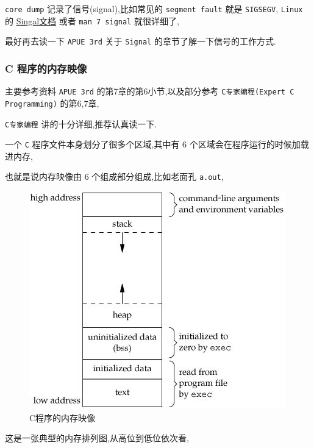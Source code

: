 \documentclass[11pt]{article}
\begin{document}
\texttt{core dump} 记录了信号(signal),比如常见的 \texttt{segment fault} 就是 \texttt{SIGSEGV}, \texttt{Linux} 的 \href{https://www.man7.org/linux/man-pages/man7/signal.7.html}{Singal文档} 或者 \texttt{man 7 signal} 就很详细了,

最好再去读一下 \texttt{APUE 3rd} 关于 \texttt{Signal} 的章节了解一下信号的工作方式.


\subsubsection{C 程序的内存映像}
\label{sec:org1aec749}

主要参考资料 \texttt{APUE 3rd} 的第7章的第6小节,以及部分参考 \texttt{C专家编程(Expert C Programming)} 的第6,7章,

\texttt{C专家编程} 讲的十分详细,推荐认真读一下.

一个 \texttt{C} 程序文件本身划分了很多个区域,其中有 6 个区域会在程序运行的时候加载进内存,

也就是说内存映像由 6 个组成部分组成,比如老面孔 \texttt{a.out},

\begin{figure}[htbp]
\centering
\includegraphics[width=.9\linewidth]{../../../files/program-image.jpg}
\caption{C程序的内存映像}
\end{figure}

这是一张典型的内存排列图,从高位到低位依次看,
\end{document}

